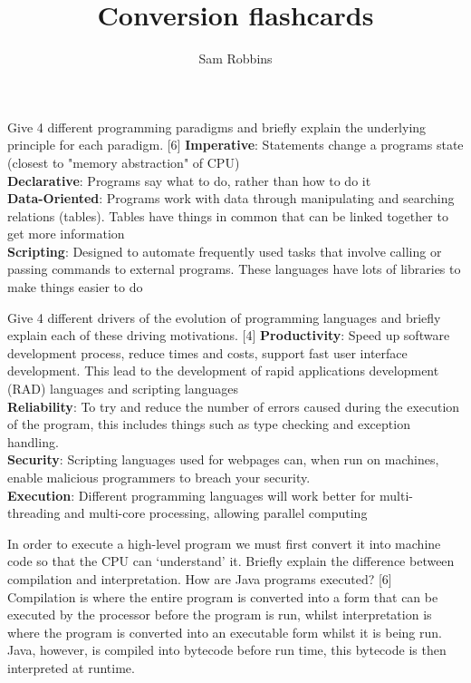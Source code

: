 \documentclass[grid,avery5388]{flashcards}
\title{Conversion flashcards}
\author{Sam Robbins}
\begin{document}
\begin{flashcard}[]{Give 4 different programming paradigms and briefly explain the underlying principle for each paradigm. [6]}
\textbf{Imperative}: Statements change a programs state (closest to "memory abstraction" of CPU)\\
\textbf{Declarative}: Programs say what to do, rather than how to do it\\
\textbf{Data-Oriented}: Programs work with data through manipulating and searching relations (tables). Tables have things in common that can be linked together to get more information\\
\textbf{Scripting}: Designed to automate frequently used tasks that involve calling or passing commands to external programs. These languages have lots of libraries to make things easier to do
\end{flashcard}

\begin{flashcard}[]{Give 4 different drivers of the evolution of programming languages and briefly explain each of these driving motivations. [4]}
\textbf{Productivity}: Speed up software development process, reduce times and costs, support fast user interface development. This lead to the development of rapid applications development (RAD) languages and scripting languages\\
\textbf{Reliability}: To try and reduce the number of errors caused during the execution of the program, this includes things such as type checking and exception handling.\\
\textbf{Security}: Scripting languages used for webpages can, when run on machines, enable malicious programmers to breach your security.\\
\textbf{Execution}: Different programming languages will work better for multi-threading and multi-core processing, allowing parallel computing
\end{flashcard}

\begin{flashcard}[]{In order to execute a high-level program we must first convert it into machine code so that the CPU can ‘understand’ it. Briefly explain
the difference between compilation and interpretation. How are Java
programs executed? [6]}
Compilation is where the entire program is converted into a form that can be executed by the processor before the program is run, whilst interpretation is where the program is converted into an executable form whilst it is being run.\\
Java, however, is compiled into bytecode before run time, this bytecode is then interpreted at runtime. 

\end{flashcard}
\end{document}
